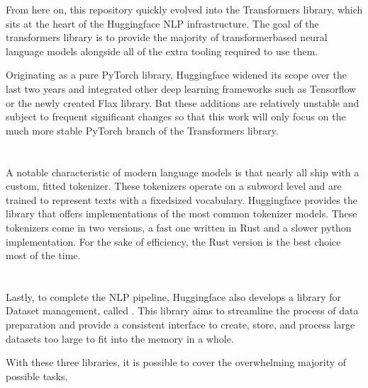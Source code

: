 \documentclass[letterpaper,10pt,english]{jupyterBook}
\begin{document}
\sphinxAtStartPar
From here on, this repository quickly evolved into the Transformers library, which sits at the heart of the Huggingface NLP infrastructure. The goal of the transformers library is to provide the majority of transformer\sphinxhyphen{}based neural language models alongside all of the extra tooling required to use them.

\sphinxAtStartPar
Originating as a pure PyTorch library, Huggingface widened its scope over the last two years and integrated other deep learning frameworks such as Tensorflow or the newly created Flax library.
But these additions are relatively unstable and subject to frequent significant changes so that this work will only focus on the much more stable PyTorch branch of the Transformers library.


\section{}
\label{\detokenize{HuggingfaceEcosystem:tokenizers}}
\sphinxAtStartPar
A notable characteristic of modern language models is that nearly all ship with a custom, fitted tokenizer.
These tokenizers operate on a subword level and are trained to represent texts with a fixed\sphinxhyphen{}sized vocabulary.
Huggingface provides the  library that offers implementations of the most common tokenizer models. These tokenizers come in two versions, a fast one written in Rust and a slower python implementation.
For the sake of efficiency, the Rust version is the best choice most of the time.


\section{}
\label{\detokenize{HuggingfaceEcosystem:datasets}}
\sphinxAtStartPar
Lastly, to complete the NLP pipeline, Huggingface also develops a library for Dataset management, called .
This library aims to streamline the process of data preparation and provide a consistent interface to create, store, and process large datasets too large to fit into the memory in a whole.

\sphinxAtStartPar
With these three libraries, it is possible to cover the overwhelming majority of possible tasks.
\end{document}

